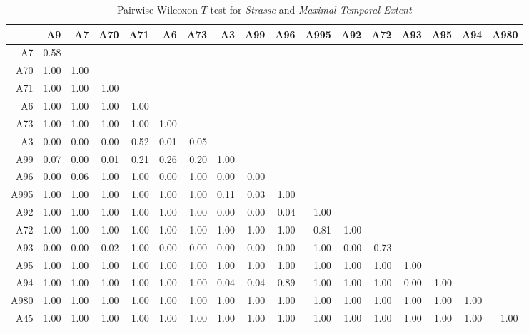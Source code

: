 \begin{table}[ht!]
	\tiny
	\setlength{\tabcolsep}{4pt}
	\centering
  \begin{tabular}{rrrrrrrrrrrrrrrrr}
    \hline
         & A9 & A7 & A70 & A71 & A6 & A73 & A3 & A99 & A96 & A995 & A92 & A72 & A93 & A95 & A94 & A980 \\ 
    \hline
    A7   & 0.58 &  &  &  &  &  &  &  &  &  &  &  &  &  &  &  \\ 
    A70  & 1.00 & 1.00 &  &  &  &  &  &  &  &  &  &  &  &  &  &  \\ 
    A71  & 1.00 & 1.00 & 1.00 &  &  &  &  &  &  &  &  &  &  &  &  &  \\ 
    A6   & 1.00 & 1.00 & 1.00 & 1.00 &  &  &  &  &  &  &  &  &  &  &  &  \\ 
    A73  & 1.00 & 1.00 & 1.00 & 1.00 & 1.00 &  &  &  &  &  &  &  &  &  &  &  \\ 
    A3   & 0.00 & 0.00 & 0.00 & 0.52 & 0.01 & 0.05 &  &  &  &  &  &  &  &  &  &  \\ 
    A99  & 0.07 & 0.00 & 0.01 & 0.21 & 0.26 & 0.20 & 1.00 &  &  &  &  &  &  &  &  &  \\ 
    A96  & 0.00 & 0.06 & 1.00 & 1.00 & 0.00 & 1.00 & 0.00 & 0.00 &  &  &  &  &  &  &  &  \\ 
    A995 & 1.00 & 1.00 & 1.00 & 1.00 & 1.00 & 1.00 & 0.11 & 0.03 & 1.00 &  &  &  &  &  &  &  \\ 
    A92  & 1.00 & 1.00 & 1.00 & 1.00 & 1.00 & 1.00 & 0.00 & 0.00 & 0.04 & 1.00 &  &  &  &  &  &  \\ 
    A72  & 1.00 & 1.00 & 1.00 & 1.00 & 1.00 & 1.00 & 1.00 & 1.00 & 1.00 & 0.81 & 1.00 &  &  &  &  &  \\ 
    A93  & 0.00 & 0.00 & 0.02 & 1.00 & 0.00 & 0.00 & 0.00 & 0.00 & 0.00 & 1.00 & 0.00 & 0.73 &  &  &  &  \\ 
    A95  & 1.00 & 1.00 & 1.00 & 1.00 & 1.00 & 1.00 & 1.00 & 1.00 & 1.00 & 1.00 & 1.00 & 1.00 & 1.00 &  &  &  \\ 
    A94  & 1.00 & 1.00 & 1.00 & 1.00 & 1.00 & 1.00 & 0.04 & 0.04 & 0.89 & 1.00 & 1.00 & 1.00 & 0.00 & 1.00 &  &  \\ 
    A980 & 1.00 & 1.00 & 1.00 & 1.00 & 1.00 & 1.00 & 1.00 & 1.00 & 1.00 & 1.00 & 1.00 & 1.00 & 1.00 & 1.00 & 1.00 &  \\ 
    A45  & 1.00 & 1.00 & 1.00 & 1.00 & 1.00 & 1.00 & 1.00 & 1.00 & 1.00 & 1.00 & 1.00 & 1.00 & 1.00 & 1.00 & 1.00 & 1.00 \\ 
    \hline
  \end{tabular}
	\caption{Pairwise Wilcoxon $T$-test for \textit{Strasse} and \textit{Maximal Temporal Extent}}
	\label{tbl:wilcoxon_baysis_matched_Strasse_TMax}
\end{table}
